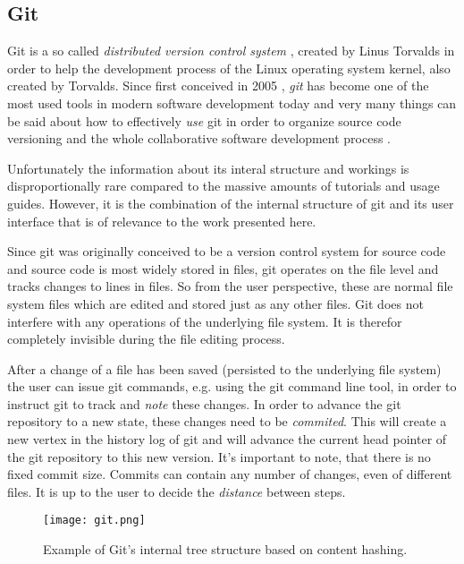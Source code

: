\subsection{Git}
\label{git}

Git is a so called \textit{distributed version control system}
\cite{git}, \cite{gitwiki} created by Linus Torvalds
\cite{gittalk} in order to help the development process of the
Linux operating system kernel, also created by Torvalds.
Since first conceived in 2005 \cite{gitbirth}, \textit{git} has become
one of the most used tools in modern software development today and
very many things can be said about how to effectively \textit{use}
git in order to organize source code versioning
and the whole collaborative software development process \cite{gitbook}.

Unfortunately the information about its interal structure and workings
is disproportionally rare compared to the massive amounts of tutorials
and usage guides. However, it is the combination of the internal
structure of git and its user interface that is of relevance to the
work presented here.
\newline

Since git was originally conceived to be a version control system
for source code and source code is most widely stored in files,
git operates on the file level and tracks changes to lines in files.
So from the user perspective, these are normal file system files
which are edited and stored just as any other files. Git does not
interfere with any operations of the underlying file system.
It is therefor completely invisible during the file editing
process.

After a change of a file has been saved (persisted to the underlying
file system) the user can issue git commands, e.g. using the
git command line tool, in order to instruct git to track and
\textit{note} these changes. In order to advance the git repository
to a new state, these changes need to be \textit{commited}. This
will create a new vertex in the history log of git and will advance
the current head pointer of the git repository to this new
version. It's important to note, that there is no fixed commit size.
Commits can contain any number of changes, even of different files.
It is up to the user to decide the \textit{distance} between
steps.

\begin{wrapfigure}{r}{0.5\textwidth}

  \texttt{[image: git.png]}
  \caption{Example of Git's internal tree structure based on content hashing.}
  \label{gittree}

\end{wrapfigure}

